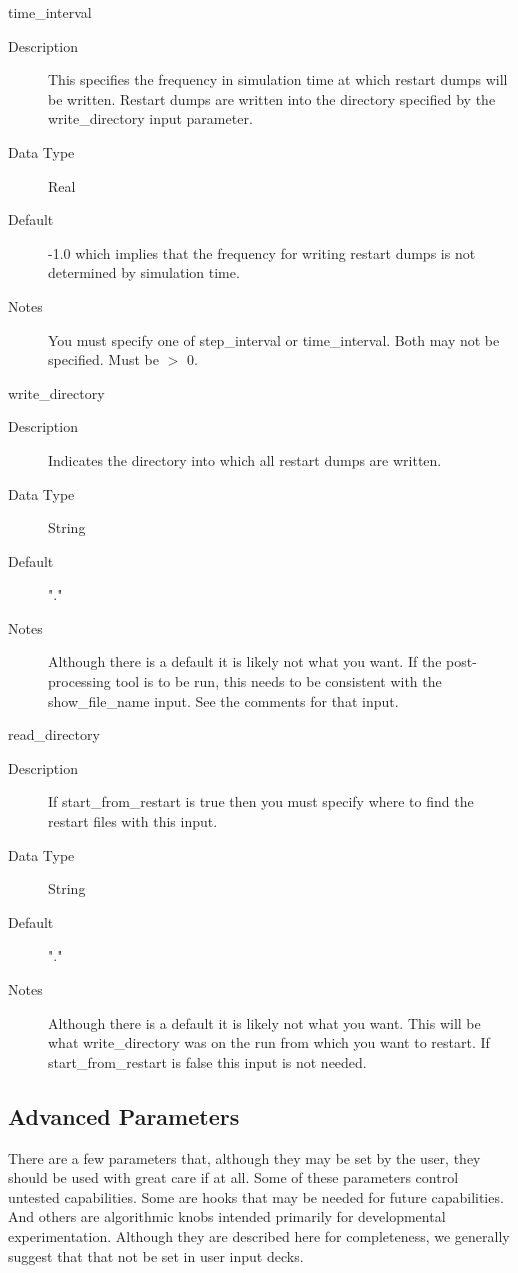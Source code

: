 \documentclass[11pt]{amsart}
\begin{document}
time\_interval
\begin{description}
\item [Description] This specifies the frequency in simulation time at which
restart dumps will be written.  Restart dumps are written into the directory
specified by the write\_directory input parameter.
\item [Data Type] Real
\item [Default] -1.0 which implies that the frequency for writing restart dumps
is not determined by simulation time.
\item [Notes] You must specify one of step\_interval or time\_interval.  Both
may not be specified.  Must be $>$ 0.
\end{description}

write\_directory
\begin{description}
\item [Description] Indicates the directory into which all restart dumps are
written.
\item [Data Type] String
\item [Default] "."
\item [Notes] Although there is a default it is likely not what you want.  If
the post-processing tool is to be run, this needs to be consistent with the
show\_file\_name input.  See the comments for that input.
\end{description}

read\_directory
\begin{description}
\item [Description] If start\_from\_restart is true then you must specify where
to find the restart files with this input.
\item [Data Type] String
\item [Default] "."
\item [Notes] Although there is a default it is likely not what you want.  This
will be what write\_directory was on the run from which you want to restart.
If start\_from\_restart is false this input is not needed.
\end{description}

\subsection*{Advanced Parameters}
There are a few parameters that, although they may be set by the user, they
should be used with great care if at all.  Some of these parameters control
untested capabilities.  Some are hooks that may be needed for future
capabilities.  And others are algorithmic knobs intended primarily for
developmental experimentation.  Although they are described here for
completeness, we generally suggest that that not be set in user input decks.
\end{document}
